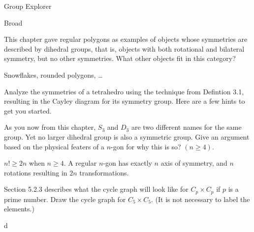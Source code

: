 \begin{questions}
	
	\question Group Explorer
	
	\question Broad
	
	\question This chapter gave regular polygons as examples of objects whose symmetries are described by dihedral groups, that is, objects with both rotational and bilateral symmetry, but no other symmetries. What other objects fit in this category?
	\begin{solution}
		\par Snowflakes, rounded polygons, \ldots
	\end{solution}
	
	\question Analyze the symmetries of a tetrahedro using the technique from Defintion 3.1, resulting in the Cayley diagram for its symmetry group. Here are a few hints to get you started.
	
	\question As you now from this chapter, $S_3$ and $D_3$ are two different names for the same group. Yet no larger dihedral group is also a symmetric group. Give an argument based on the physical featers of a $n$-gon for why this is so? $(n\geqslant 4)$.
	\begin{solution}
		\par $n! \geqslant 2n$ when $n\geqslant 4$. A regular $n$-gon has exactly $n$ axis of symmetry, and $n$ rotations resulting in $2n$ transformations.
	\end{solution}
	
	\question Section 5.2.3 describes what the cycle graph will look like for $C_p\times C_p$ if $p$ is a prime number. Draw the cycle graph for $C_5\times C_5$. (It is not necessary to label the elements.)
	\begin{solution}
		\par d
	\end{solution}


\end{questions}